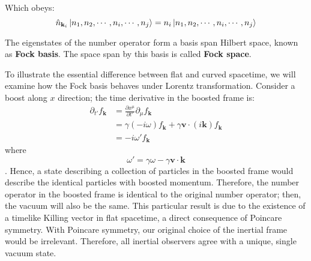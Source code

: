 \documentclass[12pt]{article}
\numberwithin{equation}{subsection}
\theoremstyle{mystyle}{\newtheorem{definition}{Definition}[subsection]}
\theoremstyle{mystyle}{\newtheorem{theorem}[definition]{Theorem}}
\theoremstyle{mystyle}{\newtheorem*{remark}{Remark}}
\theoremstyle{mystyle}{\newtheorem{example}{Example}[subsection]}
\theoremstyle{mystyle}{\newtheorem{examples}{Examples}[subsection]}
\theoremstyle{mystyle}{\newtheorem{cthm}{}[subsection]}
\newcommand{\tbf}[1]{\textbf{#1}}
\newcommand{\p}{\partial}
\begin{document}
Which obeys:
\begin{equation}
  \hat{n}_{\mathbf{k}_i}\ket{n_1,n_2,\cdots,n_i,\cdots,n_j}=    n_i\ket{n_1,n_2,\cdots,n_i,\cdots,n_j}
\end{equation}

The eigenstates of the number operator form a basis span Hilbert space, known as \tbf{Fock basis}.
The space span by this basis is called \tbf{Fock space}.

To illustrate the essential difference between flat and curved spacetime, we will examine how the Fock basis behaves under Lorentz transformation.
Consider a boost along \(x\) direction; the time derivative in the boosted frame is:
\begin{align}\label{pg}
  \p_{t'}f_{\mathbf{k}} & =\frac{\p x^{\mu}}{\p t'}\p_{\mu}f_{\mathbf{k}}                                   \\
                        & =\gamma(-i\omega)f_{\mathbf{k}}+\gamma\mathbf{v}\cdot (i\mathbf{k})f_{\mathbf{k}} \\
                        & =-i\omega'f_{\mathbf{k}}
\end{align}
where \[\omega'=\gamma\omega-\gamma\mathbf{v}\cdot \mathbf{k}\].
Hence, a state describing a collection of particles in the boosted frame would describe the identical particles with boosted momentum.
Therefore, the number operator in the boosted frame is identical to the original number operator; then, the vacuum will also be the same.
This particular result is due to the existence of a timelike Killing vector in flat spacetime, a direct consequence of Poincare symmetry.
With Poincare symmetry, our original choice of the inertial frame would be irrelevant.
Therefore, all inertial observers agree with a unique, single vacuum state.
\newpage
\end{document}
